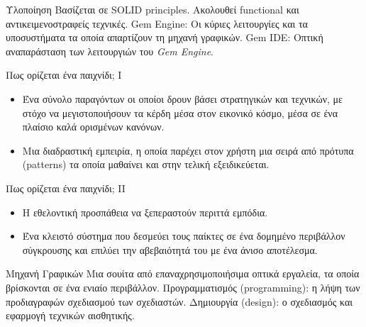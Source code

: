 \documentclass{beamer}
\begin{document}
	\begin{frame}{Υλοποίηση}
			Βασίζεται σε SOLID principles. 
			\newline
			Ακολουθεί functional και αντικειμενοστραφείς τεχνικές.
			\newline 
			\newline
			\alert{Gem Engine:} Οι κύριες λειτουργίες και τα υποσυστήματα τα οποία απαρτίζουν τη μηχανή γραφικών.
			\newline
			\alert{Gem IDE:} Οπτική αναπαράσταση των λειτουργιών του \textit{Gem Engine}.
	\end{frame}			
		
	\begin{frame}{Πως ορίζεται ένα παιχνίδι; I}
		\begin{itemize}
			\item Ένα σύνολο παραγόντων οι οποίοι δρουν βάσει στρατηγικών και τεχνικών, με στόχο να μεγιστοποιήσουν τα κέρδη μέσα στον εικονικό κόσμο, μέσα σε ένα πλαίσιο καλά ορισμένων κανόνων. 
			\item Mια διαδραστική εμπειρία, η οποία παρέχει στον χρήστη μια σειρά
			από πρότυπα (patterns) τα οποία μαθαίνει και στην τελική εξειδικεύεται.
		\end{itemize}
	\end{frame}
	
	\begin{frame}{Πως ορίζεται ένα παιχνίδι; II}
		\begin{itemize}
			\item Η εθελοντική προσπάθεια να ξεπεραστούν περιττά εμπόδια.
			\item Ένα κλειστό σύστημα που δεσμεύει τους παίκτες σε ένα δομημένο περιβάλλον σύγκρουσης και επιλύει την αβεβαιότητά του με ένα άνισο αποτέλεσμα.
		\end{itemize}
	\end{frame}
	
	\begin{frame}{Mηχανή Γραφικών}		
		Mια σουίτα από επαναχρησιμοποιήσιμα οπτικά εργαλεία, τα οποία βρίσκονται σε ένα ενιαίο περιβάλλον. 
		\newline
		\newline
		\alert{Προγραμματισμός (programming)}: η λήψη των προδιαγραφών σχεδιασμού των σχεδιαστών.
		\newline
		\alert{Δημιουργία (design)}: ο σχεδιασμός και εφαρμογή τεχνικών αισθητικής.		
	\end{frame}
	
\end{document}
